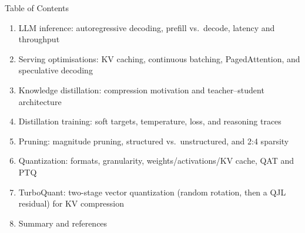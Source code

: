 \begin{frame}{Table of Contents}
  \begin{enumerate}\itemsep0.15em
    \item LLM inference: autoregressive decoding, prefill vs.\ decode, latency and throughput
    \item Serving optimisations: KV caching, continuous batching, PagedAttention, and speculative decoding
    \item Knowledge distillation: compression motivation and teacher--student architecture
    \item Distillation training: soft targets, temperature, loss, and reasoning traces
    \item Pruning: magnitude pruning, structured vs.\ unstructured, and 2:4 sparsity
    \item Quantization: formats, granularity, weights/activations/KV cache, QAT and PTQ
    \item TurboQuant: two-stage vector quantization (random rotation, then a QJL residual) for KV compression
    \item Summary and references
  \end{enumerate}
\end{frame}
